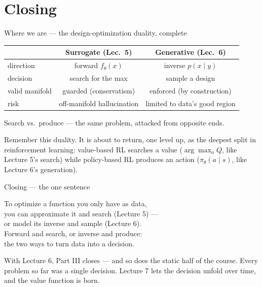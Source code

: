 \documentclass[10pt, aspectratio=169]{beamer}
\begin{document}
\section{Closing}

\begin{frame}{Where we are --- the design-optimization duality, complete}
\vspace{2pt}
\begin{center}\footnotesize\renewcommand{\arraystretch}{1.45}
\begin{tabular}{l|c|c}
 & \textbf{Surrogate (Lec.\ 5)} & \textbf{Generative (Lec.\ 6)} \\
\hline
direction & forward $f_\theta(x)$ & inverse $p(x\mid y)$ \\
decision & \alert{search} for the max & \alert{sample} a design \\
valid manifold & guarded (conservatism) & enforced (by construction) \\
risk & off-manifold hallucination & limited to data's good region \\
\end{tabular}
\end{center}
\medskip

\pause
\begin{center}\large
\alert{Search vs.\ produce} --- the same problem, attacked from opposite ends.
\end{center}
\medskip

\pause
Remember this duality. It is about to return, one level up, as the deepest split in reinforcement learning: \alert{value-based RL searches a value} ($\arg\max_a Q$, like Lecture 5's search) while \alert{policy-based RL produces an action} ($\pi_\theta(a\mid s)$, like Lecture 6's generation).
\end{frame}

\begin{frame}{Closing --- the one sentence}
\vfill
\begin{center}\large
To optimize a function you only have as data,\\[6pt]
you can approximate it and \alert{search} (Lecture 5) ---\\[4pt]
or model its inverse and \alert{sample} (Lecture 6).\\[8pt]
Forward and search, or inverse and produce:\\[4pt]
the two ways to turn data into a decision.
\end{center}
\vfill
\pause
\footnotesize
With Lecture 6, Part III closes --- and so does the static half of the course. Every problem so far was a single decision. Lecture 7 lets the decision unfold over time, and the value function is born.
\end{frame}
\end{document}
